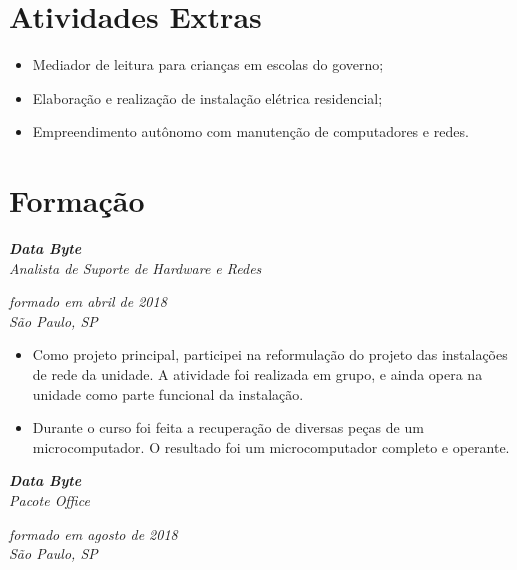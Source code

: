 \documentclass{article}
\begin{document}
\section{Atividades Extras}

\begin{itemize}
    \item Mediador de leitura para crianças em escolas do governo;
    \item Elaboração e realização de instalação elétrica residencial;
    \item Empreendimento autônomo com manutenção de computadores e redes.
\end{itemize}

\section{Formação}

\begin{multicols}{2}
    \noindent
    \begin{flushleft}
        \textbf{\textit{Data Byte}} \\
        \textit{Analista de Suporte de Hardware e Redes}
    \end{flushleft}
    \columnbreak{}
    \begin{flushright}
        \textit{formado em abril de 2018} \\
        \textit{São Paulo, SP}
    \end{flushright}
\end{multicols}

\begin{itemize}
    \item Como projeto principal, participei na reformulação do projeto das
        instalações de rede da unidade. A atividade foi realizada em grupo, e
        ainda opera na unidade como parte funcional da instalação.
    \item Durante o curso foi feita a recuperação de diversas peças de um
        microcomputador. O resultado foi um microcomputador completo e operante.
\end{itemize}

\begin{multicols}{2}
    \noindent
    \begin{flushleft}
        \textbf{\textit{Data Byte}} \\
        \textit{Pacote Office}
    \end{flushleft}
    \columnbreak{}
    \begin{flushright}
        \textit{formado em agosto de 2018} \\
        \textit{São Paulo, SP}
    \end{flushright}
\end{multicols}
\end{document}
